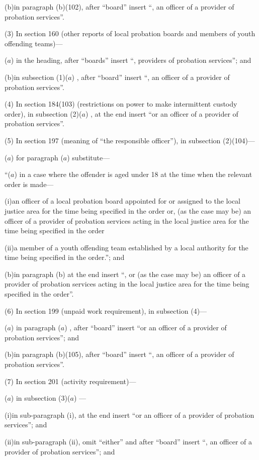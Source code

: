 \documentclass[12pt,a4paper]{article}
\begin{document}
(b)in paragraph (b)(102), after “board” insert “, an officer of a provider of probation services”.

(3) In section 160 (other reports of local probation boards and members of youth offending teams)—

($a$) in the heading, after “boards” insert “, providers of probation services”; and

(b)in subsection (1)($a$) , after “board” insert “, an officer of a provider of probation services”.

(4) In section 184(103) (restrictions on power to make intermittent custody order), in subsection (2)($a$) , at the end insert “or an officer of a provider of probation services”.

(5) In section 197 (meaning of “the responsible officer”), in subsection (2)(104)—

($a$) for paragraph ($a$)  substitute—

“($a$) in a case where the offender is aged under 18 at the time when the relevant order is made—

(i)an officer of a local probation board appointed for or assigned to the local justice area for the time being specified in the order or, (as the case may be) an officer of a provider of probation services acting in the local justice area for the time being specified in the order

(ii)a member of a youth offending team established by a local authority for the time being specified in the order.”; and

(b)in paragraph (b) at the end insert “, or (as the case may be) an officer of a provider of probation services acting in the local justice area for the time being specified in the order”.

(6) In section 199 (unpaid work requirement), in subsection (4)—

($a$) in paragraph ($a$) , after “board” insert “or an officer of a provider of probation services”; and

(b)in paragraph (b)(105), after “board” insert “, an officer of a provider of probation services”.

(7) In section 201 (activity requirement)—

($a$) in subsection (3)($a$) —

(i)in sub-paragraph (i), at the end insert “or an officer of a provider of probation services”; and

(ii)in sub-paragraph (ii), omit “either” and after “board” insert “, an officer of a provider of probation services”; and
\end{document}
